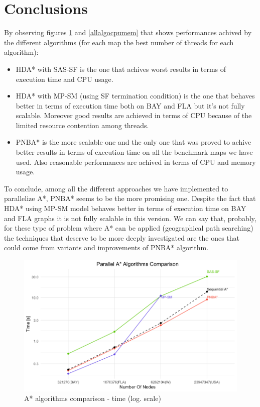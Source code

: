 \documentclass[twocolumn, switch]{article} %
\begin{document}
\section{Conclusions}
By observing figures \ref{allalgotime} and \ref{allalgocpumem} that shows performances achived by the
different algorithms (for each map the best number of threads for each algorithm):
\begin{itemize}
  \item HDA* with SAS-SF is the one that achives worst results in terms of execution time and CPU usage.
  \item HDA* with MP-SM (using SF termination condition) is the one that behaves better in terms of execution
        time both on BAY and FLA but it's not fully scalable. Moreover good results are achieved in terms of
        CPU because of the limited resource contention among threads.
  \item PNBA* is the more scalable one and the only one that was proved to achive better results in terms of
        execution time on all the benchmark maps we have used. Also reasonable performances are achived in terms
        of CPU and memory usage.
\end{itemize}
To conclude, among all the different approaches we have implemented to parallelize A*, PNBA* seems to be the more
promising one. Despite the fact that HDA* using MP-SM model behaves better in terms of execution time on BAY and FLA
graphs it is not fully scalable in this version. We can say that, probably, for these type of problem where A* can
be applied (geographical path searching) the techniques that deserve to be more deeply investigated are the ones
that could come from variants and improvements of PNBA* algorithm.
\begin{figure}[ht!]
  \centering
  \includegraphics[width=1\linewidth]{others/all_algo_time_log.png}
  \caption{A* algorithms comparison - time (log. scale)}
  \label{allalgotime}
\end{figure}
\end{document}
